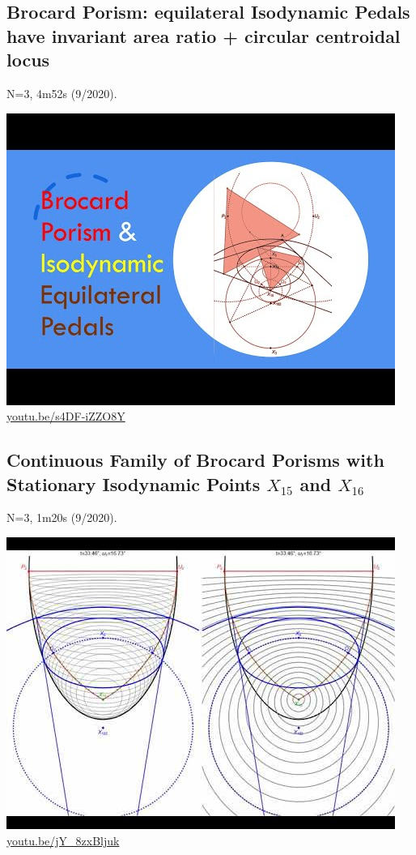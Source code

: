 \documentclass[12pt]{amsart}
\begin{document}
\subsection{Brocard Porism: equilateral Isodynamic Pedals have invariant area ratio + circular centroidal locus}
\label{vid:s4DF-iZZO8Y}
\noindent N=3, 4m52s (9/2020). 
\begin{center}\includegraphics[width=.5\textwidth]{pics/s4DF-iZZO8Y.jpg} \\ 
\href{https://youtu.be/s4DF-iZZO8Y}{\url{youtu.be/s4DF-iZZO8Y}}\end{center}
% 

\subsection{Continuous Family of Brocard Porisms with Stationary Isodynamic Points $X_{15}$ and $X_{16}$}
\label{vid:jY_8zxBljuk}
\noindent N=3, 1m20s (9/2020). 
\begin{center}\includegraphics[width=.5\textwidth]{pics/jY_8zxBljuk.jpg} \\ 
\href{https://youtu.be/jY_8zxBljuk}{\url{youtu.be/jY\_8zxBljuk}}\end{center}
% 
\end{document}

